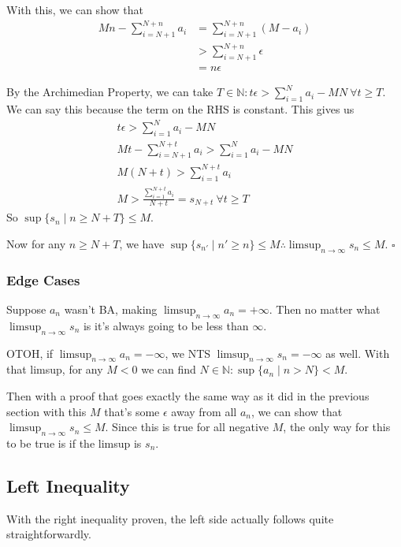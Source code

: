 \documentclass[12pt]{article}
\newcommand{\N}{\mathbb{N}}
\begin{document}
With this, we can show that
\begin{align*}
  Mn - \sum_{i=N+1}^{N+n} a_i
   & = \sum_{i=N+1}^{N+n} (M - a_i) \\
   & > \sum_{i=N+1}^{N+n} \epsilon  \\
   & = n\epsilon
\end{align*}

By the Archimedian Property, we can take $T \in \N: t\epsilon > \sum_{i=1}^{N} a_i - MN\ \forall t \ge T$.
We can say this because the term on the RHS is constant.
This gives us
\begin{gather*}
  t\epsilon > \sum_{i=1}^{N} a_i - MN \\
  Mt - \sum_{i=N+1}^{N+t} a_i > \sum_{i=1}^{N} a_i - MN \\
  M(N+t) > \sum_{i=1}^{N+t} a_i \\
  M > \frac{\sum_{i=1}^{N+t} a_i}{N+t} = s_{N+t}\ \forall t \ge T
\end{gather*}
So $\sup \{s_n \mid n \ge N+T\} \le M$.

Now for any $n \ge N+T$, we have
$\sup \{s_{n'} \mid n' \ge n\} \le M \therefore \limsup_{n \to \infty} s_n \le M$. $\square$

\subsubsection{Edge Cases}

Suppose $a_n$ wasn't BA, making $\limsup_{n \to \infty} a_n = +\infty$.
Then no matter what $\limsup_{n \to \infty} s_n$ is it's always going to be less than $\infty$.

OTOH, if $\limsup_{n \to \infty} a_n = -\infty$, we NTS $\limsup_{n \to \infty} s_n = -\infty$ as well.
With that limsup, for any $M < 0$ we can find $N \in \N: \sup \{a_n \mid n > N\} < M$.

Then with a proof that goes exactly the same way as it did in the previous section
with this $M$ that's some $\epsilon$ away from all $a_n$,
we can show that $\limsup_{n \to \infty} s_n \le M$.
Since this is true for all negative $M$, the only way for this to be true is if the limsup is $s_n$.

\subsection{Left Inequality}

With the right inequality proven, the left side actually follows quite straightforwardly.
\end{document}
